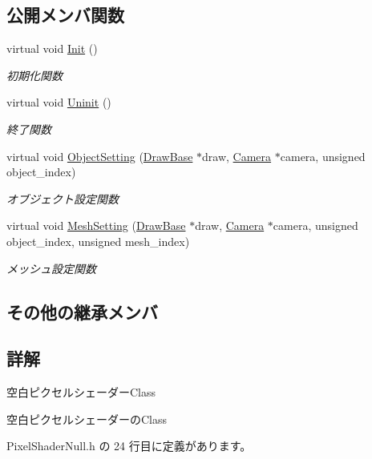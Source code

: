 \subsection*{公開メンバ関数}
\begin{DoxyCompactItemize}
\item 
virtual void \mbox{\hyperlink{class_pixel_shader_null_a5318be2bf26892c385d863e3e8409571}{Init}} ()
\begin{DoxyCompactList}\small\item\em 初期化関数 \end{DoxyCompactList}\item 
virtual void \mbox{\hyperlink{class_pixel_shader_null_adca4c44cd25c90a5ebd75b459f5e641e}{Uninit}} ()
\begin{DoxyCompactList}\small\item\em 終了関数 \end{DoxyCompactList}\item 
virtual void \mbox{\hyperlink{class_pixel_shader_null_a488bde4a2c9a9c45c4ec0ad42487d3b1}{Object\+Setting}} (\mbox{\hyperlink{class_draw_base}{Draw\+Base}} $\ast$draw, \mbox{\hyperlink{class_camera}{Camera}} $\ast$camera, unsigned object\+\_\+index)
\begin{DoxyCompactList}\small\item\em オブジェクト設定関数 \end{DoxyCompactList}\item 
virtual void \mbox{\hyperlink{class_pixel_shader_null_a89b6f0558a969478b06af52bb8e6ee16}{Mesh\+Setting}} (\mbox{\hyperlink{class_draw_base}{Draw\+Base}} $\ast$draw, \mbox{\hyperlink{class_camera}{Camera}} $\ast$camera, unsigned object\+\_\+index, unsigned mesh\+\_\+index)
\begin{DoxyCompactList}\small\item\em メッシュ設定関数 \end{DoxyCompactList}\end{DoxyCompactItemize}
\subsection*{その他の継承メンバ}


\subsection{詳解}
空白ピクセルシェーダー\+Class 

空白ピクセルシェーダーの\+Class 

 Pixel\+Shader\+Null.\+h の 24 行目に定義があります。



